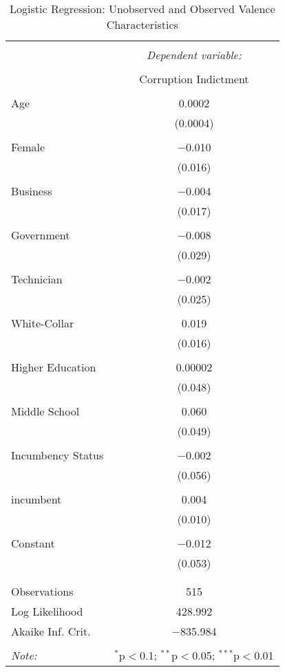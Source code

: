 \documentclass{article}
\begin{document}
\begin{table}[!htbp] \centering 
  \caption{Logistic Regression: Unobserved and Observed Valence Characteristics} 
  \label{} 
\begin{tabular}{@{\extracolsep{5pt}}lc} 
\\[-1.8ex]\hline 
\hline \\[-1.8ex] 
 & \multicolumn{1}{c}{\textit{Dependent variable:}} \\ 
\cline{2-2} 
\\[-1.8ex] & Corruption Indictment \\ 
\hline \\[-1.8ex] 
 Age & 0.0002 \\ 
  & (0.0004) \\ 
  & \\ 
 Female & $-$0.010 \\ 
  & (0.016) \\ 
  & \\ 
 Business & $-$0.004 \\ 
  & (0.017) \\ 
  & \\ 
 Government & $-$0.008 \\ 
  & (0.029) \\ 
  & \\ 
 Technician & $-$0.002 \\ 
  & (0.025) \\ 
  & \\ 
 White-Collar & 0.019 \\ 
  & (0.016) \\ 
  & \\ 
 Higher Education & 0.00002 \\ 
  & (0.048) \\ 
  & \\ 
 Middle School & 0.060 \\ 
  & (0.049) \\ 
  & \\ 
 Incumbency Status & $-$0.002 \\ 
  & (0.056) \\ 
  & \\ 
 incumbent & 0.004 \\ 
  & (0.010) \\ 
  & \\ 
 Constant & $-$0.012 \\ 
  & (0.053) \\ 
  & \\ 
\hline \\[-1.8ex] 
Observations & 515 \\ 
Log Likelihood & 428.992 \\ 
Akaike Inf. Crit. & $-$835.984 \\ 
\hline 
\hline \\[-1.8ex] 
\textit{Note:}  & \multicolumn{1}{r}{$^{*}$p$<$0.1; $^{**}$p$<$0.05; $^{***}$p$<$0.01} \\ 
\end{tabular} 
\end{table} 
\end{document}

